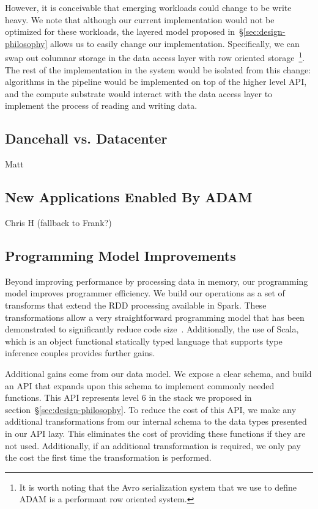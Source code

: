 \documentclass[10pt,twocolumn]{article}
\begin{document}
However, it is conceivable that emerging workloads could change to be write heavy. We note that although our current
implementation would not be optimized for these workloads, the layered model proposed in~\S\ref{sec:design-philosophy}
allows us to easily change our implementation. Specifically, we can swap out columnar storage in the data access layer with
row oriented storage~\footnote{It is worth noting that the Avro serialization system that we use to define ADAM is a performant
row oriented system.}. The rest of the implementation in the system would be isolated from this change: algorithms in the
pipeline would be implemented on top of the higher level API, and the compute substrate would interact with the data access
layer to implement the process of reading and writing data. 

\subsection{Dancehall vs. Datacenter}
\label{sec:dancehall-vs-datacenter}

Matt

\subsection{New Applications Enabled By ADAM}
\label{sec:new-applications}

Chris H (fallback to Frank?)

\subsection{Programming Model Improvements}
\label{sec:programming-model-improvements}

Beyond improving performance by processing data in memory, our programming model improves programmer efficiency.
We build our operations as a set of transforms that extend the RDD processing available in Spark. These transformations
allow a very straightforward programming model that has been demonstrated to significantly reduce code size~\cite{zaharia12}.
Additionally, the use of Scala, which is an object functional statically typed language that supports type inference couples
provides further gains.

Additional gains come from our data model. We expose a clear schema, and build an API that expands upon this schema
to implement commonly needed functions. This API represents level 6 in the stack we proposed in
section~\S\ref{sec:design-philosophy}. To reduce the cost of this API, we make any additional transformations from our
internal schema to the data types presented in our API lazy. This eliminates the cost of providing these functions if they are
not used. Additionally, if an additional transformation is required, we only pay the cost the first time the transformation is performed.
\end{document}
